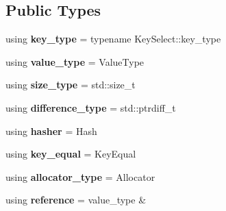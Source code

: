 \subsection*{Public Types}
\begin{DoxyCompactItemize}
\item 
\mbox{\label{classtsl_1_1detail__robin__hash_1_1robin__hash_a283312016dcb08dd7e64bfebb94a284b}} 
using {\bfseries key\+\_\+type} = typename Key\+Select\+::key\+\_\+type
\item 
\mbox{\label{classtsl_1_1detail__robin__hash_1_1robin__hash_a7040c9dfa801bb5b4e8c0333a8df43f0}} 
using {\bfseries value\+\_\+type} = Value\+Type
\item 
\mbox{\label{classtsl_1_1detail__robin__hash_1_1robin__hash_adda293c49b4383de44cfe90428b53abe}} 
using {\bfseries size\+\_\+type} = std\+::size\+\_\+t
\item 
\mbox{\label{classtsl_1_1detail__robin__hash_1_1robin__hash_a5cfbcd23725f53d67dc61f58e8a1379e}} 
using {\bfseries difference\+\_\+type} = std\+::ptrdiff\+\_\+t
\item 
\mbox{\label{classtsl_1_1detail__robin__hash_1_1robin__hash_a0b9227d7a66492cef157cd8c9dc8e319}} 
using {\bfseries hasher} = Hash
\item 
\mbox{\label{classtsl_1_1detail__robin__hash_1_1robin__hash_a2c4de138a046875ad6861b9ec3e1259e}} 
using {\bfseries key\+\_\+equal} = Key\+Equal
\item 
\mbox{\label{classtsl_1_1detail__robin__hash_1_1robin__hash_aeda2cef10fe15ff7953e6aa0433ada6a}} 
using {\bfseries allocator\+\_\+type} = Allocator
\item 
\mbox{\label{classtsl_1_1detail__robin__hash_1_1robin__hash_a3ea7411cc9c577ff7e3173376507f8f6}} 
using {\bfseries reference} = value\+\_\+type \&
\item 

\end{DoxyCompactItemize}

